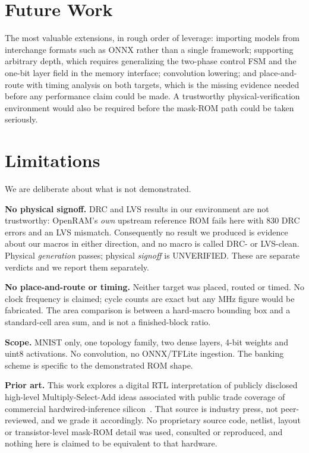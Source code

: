 \documentclass[conference]{IEEEtran}
\begin{document}
\section{Future Work}

The most valuable extensions, in rough order of leverage: importing models from
interchange formats such as ONNX rather than a single framework; supporting
arbitrary depth, which requires generalizing the two-phase control FSM and the
one-bit layer field in the memory interface; convolution lowering; and
place-and-route with timing analysis on both targets, which is the missing
evidence needed before any performance claim could be made. A trustworthy
physical-verification environment would also be required before the mask-ROM
path could be taken seriously.

\section{Limitations}

We are deliberate about what is not demonstrated.

\textbf{No physical signoff.} DRC and LVS results in our environment are not
trustworthy: OpenRAM's \emph{own} upstream reference ROM fails here with 830
DRC errors and an LVS mismatch. Consequently no result we produced is evidence
about our macros in either direction, and no macro is called DRC- or LVS-clean.
Physical \emph{generation} passes; physical \emph{signoff} is UNVERIFIED. These
are separate verdicts and we report them separately.

\textbf{No place-and-route or timing.} Neither target was placed, routed or
timed. No clock frequency is claimed; cycle counts are exact but any MHz figure
would be fabricated. The area comparison is between a hard-macro bounding box
and a standard-cell area sum, and is not a finished-block ratio.

\textbf{Scope.} MNIST only, one topology family, two dense layers, 4-bit
weights and uint8 activations. No convolution, no ONNX/TFLite ingestion. The
banking scheme is specific to the demonstrated ROM shape.

\textbf{Prior art.} This work explores a digital RTL interpretation of publicly
disclosed high-level Multiply-Select-Add ideas associated with public trade
coverage of commercial hardwired-inference silicon~\cite{taalas}. That source is
industry press, not peer-reviewed, and we grade it accordingly. No proprietary
source code, netlist, layout or transistor-level mask-ROM detail was used,
consulted or reproduced, and nothing here is claimed to be equivalent to that
hardware.
\end{document}
